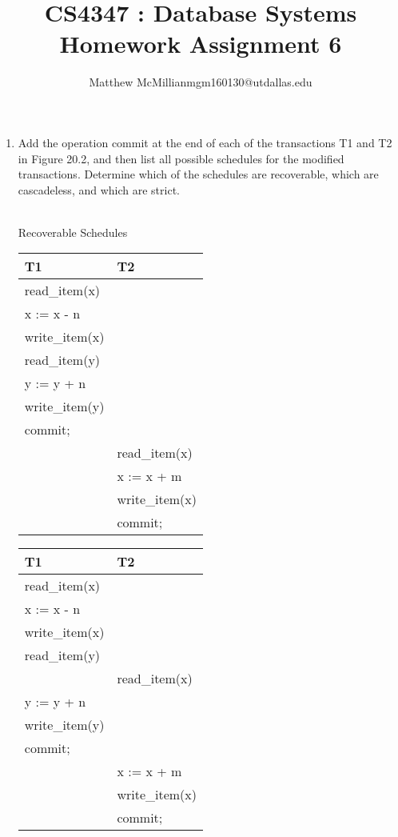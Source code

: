 \documentclass[12pt]{article}
\begin{document}
\title{CS4347 : Database Systems\\Homework Assignment 6}
\author{Matthew McMillianmgm160130@utdallas.edu}
\maketitle



\begin{enumerate}

	\item  Add the operation commit at the end of each of the transactions T1 and T2 in Figure 20.2, and then list all possible schedules for the modified transactions. Determine which of the schedules are recoverable, which are cascadeless, and which are strict. \\ \\
	

 	\begin{center}
 		Recoverable Schedules
 	\end{center}
    \begin{minipage}{.5\linewidth}

      \centering
       \begin{tabular}{|l|l|}
\hline
T1 & T2 \\ \hline
read\_item(x) &  \\ \hline
x := x - n &  \\ \hline
write\_item(x) &  \\ \hline
read\_item(y) &  \\ \hline
y := y + n &  \\ \hline
write\_item(y) &  \\ \hline
commit; &  \\ \hline
 & read\_item(x) \\ \hline
 & x := x + m \\ \hline
 & write\_item(x) \\ \hline
 & commit; \\ \hline
\end{tabular}
    \end{minipage}%
    \begin{minipage}{.5\linewidth}
      \centering
      
        \begin{tabular}{|l|l|}
\hline
T1 & T2 \\ \hline
read\_item(x) &  \\ \hline
x := x - n &  \\ \hline
write\_item(x) &  \\ \hline
read\_item(y) &  \\ \hline
 & read\_item(x) \\ \hline
y := y + n &  \\ \hline
write\_item(y) &  \\ \hline
commit; &  \\ \hline
 & x := x + m \\ \hline
 & write\_item(x) \\ \hline
 & commit; \\ \hline
\end{tabular}
    \end{minipage} 


\end{enumerate}
\end{document}
